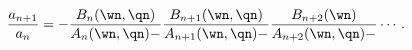 \begin{equation}
{a_{n+1}\over a_{n}} = - {B_{n}(\wn,\qn)\over A_{n}(\wn,\qn)
-}{B_{n+1}(\wn,\qn)\over A_{n+1}(\wn,\qn)-}{B_{n+2}(\wn)\over A_{n+2}(\wn,\qn)
-}\cdots \,. 
\label{fractionn}
\end{equation}

